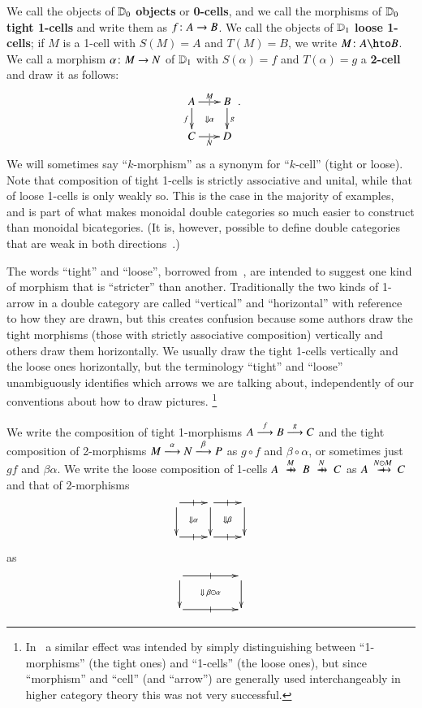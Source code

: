 We call the objects of $\lD_0$ \textbf{objects} or \textbf{0-cells},
and we call the morphisms of $\lD_0$ \textbf{tight 1-cells}
and write them as $f\maps A\to B$.  We call the objects of $\lD_1$
\textbf{loose 1-cells}; if $M$ is a 1-cell with $S(M)=A$ and
$T(M)=B$, we write $M\maps A\hto B$.  We call a morphism $\alpha\maps
M\to N$ of $\lD_1$ with $S(\alpha)=f$ and $T(\alpha)=g$ a
\textbf{2-cell} and draw it as follows:
\begin{equation}\label{eq:square}
  \xymatrix@-.5pc{
    A \ar[r]|{|}^{M}  \ar[d]_f \ar@{}[dr]|{\Downarrow\alpha}&
    B\ar[d]^g\\
    C \ar[r]|{|}_N & D
  }.
\end{equation}
We will sometimes say ``$k$-morphism'' as a synonym for ``$k$-cell'' (tight or loose).
Note that composition of tight 1-cells is strictly associative and unital, while that of loose 1-cells is only weakly so.
This is the case in the majority of examples, and is part of what makes monoidal double categories so much easier to construct than monoidal bicategories.
(It is, however, possible to define double categories that are weak in both directions~\cite{verity:base-change}.)

The words ``tight'' and ``loose'', borrowed from~\cite{ls:limlax}, are intended to suggest one kind of morphism that is ``stricter'' than another.
Traditionally the two kinds of 1-arrow in a double category are called ``vertical'' and ``horizontal'' with reference to how they are drawn, but this creates confusion because some authors draw the tight morphisms (those with strictly associative composition) vertically and others draw them horizontally.
We usually draw the tight 1-cells vertically and the loose ones horizontally, but the terminology ``tight'' and ``loose'' unambiguously identifies which arrows we are talking about, independently of our conventions about how to draw pictures.%
\footnote{In~\cite{shulman:smbicat} a similar effect was intended by simply distinguishing between ``1-morphisms'' (the tight ones) and ``1-cells'' (the loose ones), but since ``morphism'' and ``cell'' (and ``arrow'') are generally used interchangeably in higher category theory this was not very successful.}

We write the composition of tight 1-morphisms $A\too[f] B\too[g] C$
and the tight composition of 2-morphisms $M\too[\alpha]
N\too[\beta] P$ as $g\circ f$ and $\beta\circ\alpha$, or sometimes
just $gf$ and $\beta\alpha$.  We write the loose composition of
1-cells $A\xhto{M} B \xhto{N} C$ as $A\xhto{N\odot M} C$ and that of
2-morphisms
\[\vcenter{\xymatrix{ \ar[r]|-@{|}^-{} \ar[d] \ar@{}[dr]|{\Downarrow\alpha} &
     \ar[r]|-@{|}^-{} \ar[d] \ar@{}[dr]|{\Downarrow\beta} &\ar[d]\\
  \ar[r]|-@{|}_-{} & \ar[r]|-@{|}_-{} & }}\]
as
\[\vcenter{\xymatrix@C=4pc{ \ar[r]|-@{|}^-{} \ar[d] \ar@{}[dr]|{\Downarrow\;\be\odot\al} &  \ar[d]\\
  \ar[r]|-@{|}_-{} & }}\]


